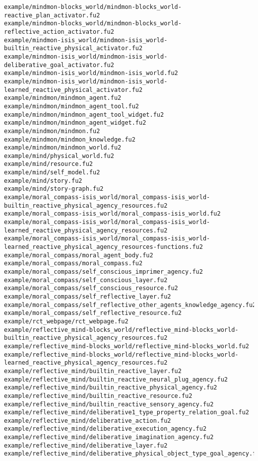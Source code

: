 \begin{lstlisting}
example/mindmon-blocks_world/mindmon-blocks_world-reactive_plan_activator.fu2
example/mindmon-blocks_world/mindmon-blocks_world-reflective_action_activator.fu2
example/mindmon-isis_world/mindmon-isis_world-builtin_reactive_physical_activator.fu2
example/mindmon-isis_world/mindmon-isis_world-deliberative_goal_activator.fu2
example/mindmon-isis_world/mindmon-isis_world.fu2
example/mindmon-isis_world/mindmon-isis_world-learned_reactive_physical_activator.fu2
example/mindmon/mindmon_agent.fu2
example/mindmon/mindmon_agent_tool.fu2
example/mindmon/mindmon_agent_tool_widget.fu2
example/mindmon/mindmon_agent_widget.fu2
example/mindmon/mindmon.fu2
example/mindmon/mindmon_knowledge.fu2
example/mindmon/mindmon_world.fu2
example/mind/physical_world.fu2
example/mind/resource.fu2
example/mind/self_model.fu2
example/mind/story.fu2
example/mind/story-graph.fu2
example/moral_compass-isis_world/moral_compass-isis_world-builtin_reactive_physical_agency_resources.fu2
example/moral_compass-isis_world/moral_compass-isis_world.fu2
example/moral_compass-isis_world/moral_compass-isis_world-learned_reactive_physical_agency_resources.fu2
example/moral_compass-isis_world/moral_compass-isis_world-learned_reactive_physical_agency_resources-functions.fu2
example/moral_compass/moral_agent_body.fu2
example/moral_compass/moral_compass.fu2
example/moral_compass/self_conscious_imprimer_agency.fu2
example/moral_compass/self_conscious_layer.fu2
example/moral_compass/self_conscious_resource.fu2
example/moral_compass/self_reflective_layer.fu2
example/moral_compass/self_reflective_other_agents_knowledge_agency.fu2
example/moral_compass/self_reflective_resource.fu2
example/rct_webpage/rct_webpage.fu2
example/reflective_mind-blocks_world/reflective_mind-blocks_world-builtin_reactive_physical_agency_resources.fu2
example/reflective_mind-blocks_world/reflective_mind-blocks_world.fu2
example/reflective_mind-blocks_world/reflective_mind-blocks_world-learned_reactive_physical_agency_resources.fu2
example/reflective_mind/builtin_reactive_layer.fu2
example/reflective_mind/builtin_reactive_neural_plug_agency.fu2
example/reflective_mind/builtin_reactive_physical_agency.fu2
example/reflective_mind/builtin_reactive_resource.fu2
example/reflective_mind/builtin_reactive_sensory_agency.fu2
example/reflective_mind/deliberative1_type_property_relation_goal.fu2
example/reflective_mind/deliberative_action.fu2
example/reflective_mind/deliberative_execution_agency.fu2
example/reflective_mind/deliberative_imagination_agency.fu2
example/reflective_mind/deliberative_layer.fu2
example/reflective_mind/deliberative_physical_object_type_goal_agency.fu2

\end{lstlisting}
